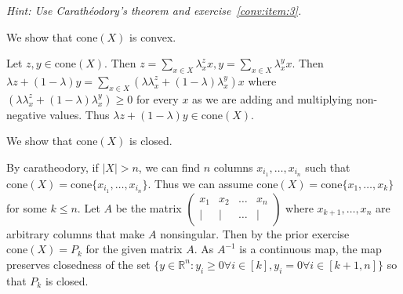 \documentclass[11pt]{article}
\newcommand{\setR}{\mathbb{R}}
\renewcommand{\leq}{\leqslant}
\renewcommand{\geq}{\geqslant}
\newcommand{\cone}{\mathrm{cone}}
\begin{document}
\begin{enumerate}[1)]
  \emph{Hint: Use Carath\'eodory's theorem and exercise~\ref{conv:item:3}.}
  
  
  
  \begin{solution}
  We show that $\cone(X)$ is convex. 
  
  
  Let $z, y \in \cone(X)$. Then $z = \displaystyle\sum_{x \in X}\lambda_x^z x, y = \displaystyle\sum_{x \in X}\lambda_x^y x$. Then $\lambda z + (1-\lambda)y = \displaystyle\sum_{x \in X}(\lambda \lambda_x^z + (1-\lambda) \lambda_x^y) x$ where $(\lambda \lambda_x^z + (1-\lambda) \lambda_x^y) \geq 0$ for every $x$ as we are adding and multiplying non-negative values. Thus $\lambda z + (1-\lambda)y \in \cone(X)$. 
  
  
  We show that $\cone(X)$ is closed. 
  
  By caratheodory, if $|X| >n$, we can find $n$ columns $x_{i_1}, \hdots, x_{i_n}$ such that $\cone(X) = \cone\{x_{i_1}, \hdots, x_{i_n}\}$. Thus we can assume $\cone(X) = \cone\{x_{1}, \hdots, x_{k}\}$ for some $k \leq n$. Let $A$ be the matrix $\begin{pmatrix} x_1 & x_2 & \hdots &x_n \\|&|&\hdots&|\end{pmatrix}$ where $x_{k+1}, \hdots, x_n$ are arbitrary columns that make $A$ nonsingular. Then by the prior exercise $\cone(X) = P_k$ for the given matrix $A$. As $A^{-1}$ is a continuous map, the map preserves closedness of the set $\{ y \in \setR^n: y_i \geq 0 \forall i \in [k], y_i = 0 \forall i \in [k+1, n]\}$ so that $P_k$ is closed. 
  
  
  \end{solution}


\end{enumerate}



  
\end{document}
